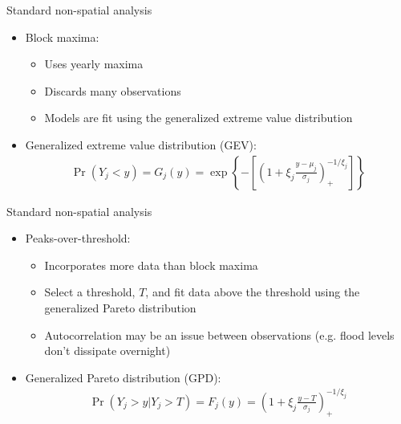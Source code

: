 \documentclass{beamer}
\begin{document}
\begin{frame}{Standard non-spatial analysis}
  \begin{itemize} \setlength{\itemsep}{0.5em}
    \item Block maxima:
    \begin{itemize}
      \item Uses yearly maxima
      \item Discards many observations
      \item Models are fit using the generalized extreme value distribution
    \end{itemize}
    \item Generalized extreme value distribution (GEV):
    \begin{align*}
      \Pr(Y_j < y) = G_j(y) = \exp \left\{ -\left[ \left(1 + \xi_j \frac{y - \mu_j}{\sigma_j}\right)_+^{-1/\xi_j} \right] \right\}
    \end{align*}
  \end{itemize}
\end{frame}

\begin{frame}{Standard non-spatial analysis}
  \begin{itemize}
    \item Peaks-over-threshold:
    \begin{itemize}
      \item Incorporates more data than block maxima
      \item Select a threshold, $T$, and fit data above the threshold using the generalized Pareto distribution
      \item Autocorrelation may be an issue between observations (e.g. flood levels don't dissipate overnight)
    \end{itemize}
    \item Generalized Pareto distribution (GPD):
    \begin{align*}
      \Pr(Y_j > y | Y_j > T) = F_j(y) = \left( 1 + \xi_j \frac{y - T}{\sigma_j} \right)_+^{-1/\xi_j}
    \end{align*}
  \end{itemize}
\end{frame}
\end{document}
